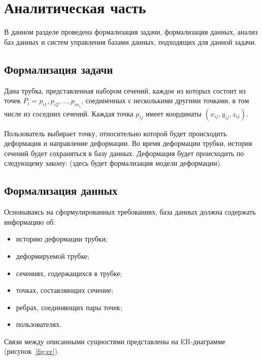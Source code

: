 \section{Аналитическая часть}

\noindent
\hspace{0.75cm}
В данном разделе проведена формализация задачи, формализация данных, анализ баз данных и систем управления базами данных, подходящих для данной задачи.

\subsection{Формализация задачи}

\noindent
\hspace{0.75cm}
Дана трубка, представленная набором сечений, каждое из которых состоит из точек $P_i = {p_{i1}, p_{i2}, ..., p_{in_i}}$, соединенных с несколькими другими точками, в том числе из соседних сечений. Каждая точка $p_{ij}$ имеет координаты $(x_{ij}, y_{ij}, z_{ij})$.

\noindent
\hspace{0.75cm}
Пользователь выбирает точку, относительно которой будет происходить деформация и направление деформации. Во время деформации трубки, история сечений будет сохраняться в базу данных. Деформация будет происходить по следующему закону: (здесь будет формализация модели деформации).

\subsection{Формализация данных}

\noindent
\hspace{0.75cm}
Основываясь на сформулированных требованиях, база данных должна содержать информацию об:

\begin{itemize}
	\item историю деформации трубки;
	\item деформируемой трубке;
	\item сечениях, содержащихся в трубке;
	\item точках, составляющих сечение;
	\item ребрах, соединяющих пары точек;
	\item пользователях.
\end{itemize}

\noindent
\hspace{0.75cm}
Связи между описанными сущностями представлены на ER-диаграмме (рисунок~\ref{fig:er}).

